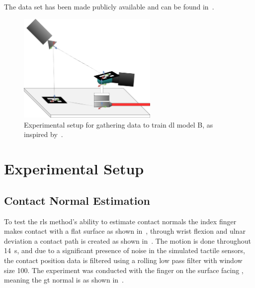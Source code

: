 The data set has been made publicly available and can be found in~\cite{biotac-dataset}.

\begin{figure}[!h]
	\begin{center}
		\includegraphics[width=0.6\textwidth]{chapters/1-tactile-perception/fig/drawio/biotac-sim-experimental-setup.pdf}
	\end{center}
	\caption{Experimental setup for gathering data to train \gls{dl} model B, as inspired by~\cite{simulation-of-the-syntouch-biotac-sensor}.}
	\label{fig:biotac-sim-experimental-setup}
\end{figure}
\newpage
\section{Experimental Setup}\label{sec:1-tactile-perception-experimental-setup}

\subsection{Contact Normal Estimation}\label{sec:1-tactile-perception-experimental-setup-contact-normal-estimation}

To test the \gls{rls} method's ability to estimate contact normals the index finger makes contact with a flat surface as shown in~, through wrist flexion and ulnar deviation a contact path is created as shown in~. The motion is done throughout \SI{14}{\second}, and due to a significant presence of noise in the simulated tactile sensors, the contact position data is filtered using a rolling low pass filter with window size \num{100}. The experiment was conducted with the finger on the surface facing , meaning the \gls{gt} normal is  as shown in~.

